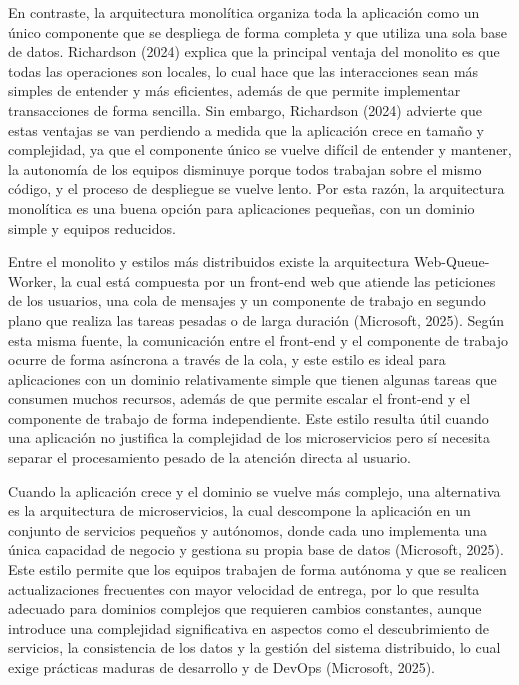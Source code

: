 \documentclass[12pt,letterpaper]{article}
\begin{document}
En contraste, la arquitectura monolítica organiza toda la aplicación como un único componente que se despliega de forma completa y que utiliza una sola base de datos. Richardson (2024) explica que la principal ventaja del monolito es que todas las operaciones son locales, lo cual hace que las interacciones sean más simples de entender y más eficientes, además de que permite implementar transacciones de forma sencilla. Sin embargo, Richardson (2024) advierte que estas ventajas se van perdiendo a medida que la aplicación crece en tamaño y complejidad, ya que el componente único se vuelve difícil de entender y mantener, la autonomía de los equipos disminuye porque todos trabajan sobre el mismo código, y el proceso de despliegue se vuelve lento. Por esta razón, la arquitectura monolítica es una buena opción para aplicaciones pequeñas, con un dominio simple y equipos reducidos.
 
Entre el monolito y estilos más distribuidos existe la arquitectura Web-Queue-Worker, la cual está compuesta por un front-end web que atiende las peticiones de los usuarios, una cola de mensajes y un componente de trabajo en segundo plano que realiza las tareas pesadas o de larga duración (Microsoft, 2025). Según esta misma fuente, la comunicación entre el front-end y el componente de trabajo ocurre de forma asíncrona a través de la cola, y este estilo es ideal para aplicaciones con un dominio relativamente simple que tienen algunas tareas que consumen muchos recursos, además de que permite escalar el front-end y el componente de trabajo de forma independiente. Este estilo resulta útil cuando una aplicación no justifica la complejidad de los microservicios pero sí necesita separar el procesamiento pesado de la atención directa al usuario.
 
Cuando la aplicación crece y el dominio se vuelve más complejo, una alternativa es la arquitectura de microservicios, la cual descompone la aplicación en un conjunto de servicios pequeños y autónomos, donde cada uno implementa una única capacidad de negocio y gestiona su propia base de datos (Microsoft, 2025). Este estilo permite que los equipos trabajen de forma autónoma y que se realicen actualizaciones frecuentes con mayor velocidad de entrega, por lo que resulta adecuado para dominios complejos que requieren cambios constantes, aunque introduce una complejidad significativa en aspectos como el descubrimiento de servicios, la consistencia de los datos y la gestión del sistema distribuido, lo cual exige prácticas maduras de desarrollo y de DevOps (Microsoft, 2025).
 
\end{document}
